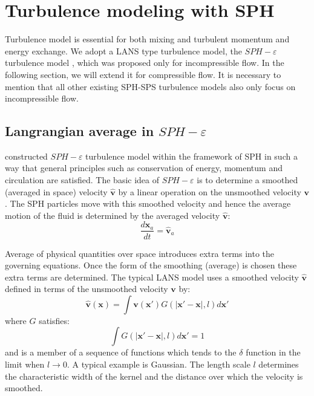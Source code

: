 
\section{Turbulence modeling with SPH}
Turbulence model is essential for both mixing and turbulent momentum and energy exchange. We adopt a LANS type turbulence model, the $SPH-\varepsilon$ turbulence model \citep{monaghan2011turbulence}, which was proposed only for incompressible flow. In the following section, we will extend it for compressible flow. It is necessary to mention that all other existing SPH-SPS turbulence models \citep{holm1999fluctuation, monaghan2002sph, violeau2007numerical} also only focus on incompressible flow.

\subsection{Langrangian average in $SPH-\varepsilon$}
\citet{monaghan2011turbulence} constructed $SPH-\varepsilon$ turbulence model within the framework of SPH in such a way that general principles such as conservation of energy, momentum and circulation are satisfied. The basic idea of $SPH-\varepsilon$ is to determine a smoothed (averaged in space) velocity $\widehat{\textbf{v}}$ by a linear operation on the unsmoothed velocity $\textbf{v}$. The SPH particles move with this smoothed velocity and hence the average motion of the fluid is determined by the averaged velocity $\widehat{\textbf{v}}$:
\begin{equation}
\dfrac{d \textbf{x}_a}{dt} = \widehat{\textbf{v}}_a \label{eq:gov-update-pos-turbulence}
\end{equation}

Average of physical quantities over space introduces extra terms into the governing equations. Once the form of the smoothing (average) is chosen these extra terms are determined.
The typical LANS model uses a smoothed velocity $\widehat{\textbf{v}}$ 
defined in terms of the unsmoothed velocity $\textbf{v}$ by:
\begin{equation}
\widehat{\textbf{v}}\left(\textbf{x}\right)=\int \textbf{v}\left(\textbf{x} \prime\right)G\left(\vert \textbf{x} \prime - \textbf{x} \vert, l\right) d\textbf{x} \prime
\label{eq:turbulence-v-filter}
\end{equation}
where $G$ satisfies:
\begin{equation}
\int G\left(\vert \textbf{x} \prime - \textbf{x} \vert, l\right) d\textbf{x} \prime =1
\end{equation}
and is a member of a sequence of functions which tends to the $\delta$ function in the limit when $ l\rightarrow 0$. A typical example is Gaussian.
The length scale $l$ determines the characteristic width of the kernel and the distance over which the velocity is smoothed.

